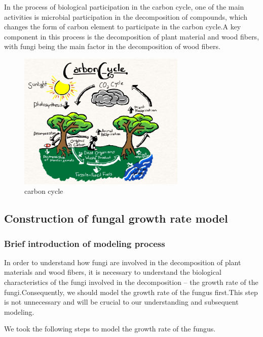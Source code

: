 \documentclass[12pt]{article}
\begin{document}
	
	In the process of biological participation in the carbon cycle, one of the main activities is microbial participation in the decomposition of compounds, which changes the form of carbon element to participate in the carbon cycle.A key component in this process is the decomposition of plant material and wood fibers, with fungi being the main factor in the decomposition of wood fibers.\\
	
	
	\begin{figure}[h] %
		\centering
		\includegraphics[width=8cm]{carboncycle.jpg}
		\caption{carbon cycle}
	\end{figure}
	
	
	
	\subsection{Construction of fungal growth rate model}
	\subsubsection{Brief introduction of modeling process}
	In order to understand how fungi are involved in the decomposition of plant materials and wood fibers, it is necessary to understand the biological characteristics of the fungi involved in the decomposition -- the growth rate of the fungi.Consequently, we should model the growth rate of the fungus first.This step is not unnecessary and will be crucial to our understanding and subsequent modeling.\par
	We took the following steps to model the growth rate of the fungus.
	
\end{document}
